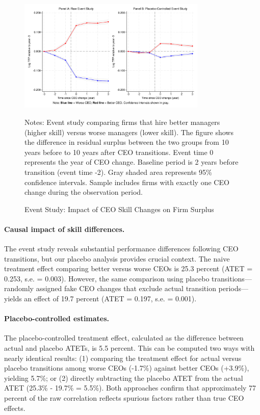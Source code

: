 \documentclass[11pt,a4paper]{article}
\begin{document}
\begin{figure}[htbp]
\centering
\includegraphics[width=0.8\textwidth]{figure/event_study.pdf}
\caption{Event Study: Impact of CEO Skill Changes on Firm Surplus}
\label{fig:event_study}
\footnotesize
Notes: Event study comparing firms that hire better managers (higher skill) versus worse managers (lower skill). The figure shows the difference in residual surplus between the two groups from 10 years before to 10 years after CEO transitions. Event time 0 represents the year of CEO change. Baseline period is 2 years before transition (event time -2). Gray shaded area represents 95\% confidence intervals. Sample includes firms with exactly one CEO change during the observation period.
\end{figure}

\paragraph{Causal impact of skill differences.} The event study reveals substantial performance differences following CEO transitions, but our placebo analysis provides crucial context. The naive treatment effect comparing better versus worse CEOs is 25.3 percent (ATET = 0.253, s.e. = 0.003). However, the same comparison using placebo transitions---randomly assigned fake CEO changes that exclude actual transition periods---yields an effect of 19.7 percent (ATET = 0.197, s.e. = 0.001).

\paragraph{Placebo-controlled estimates.} The placebo-controlled treatment effect, calculated as the difference between actual and placebo ATETs, is 5.5 percent. This can be computed two ways with nearly identical results: (1) comparing the treatment effect for actual versus placebo transitions among worse CEOs (-1.7\%) against better CEOs (+3.9\%), yielding 5.7\%; or (2) directly subtracting the placebo ATET from the actual ATET (25.3\% - 19.7\% = 5.5\%). Both approaches confirm that approximately 77 percent of the raw correlation reflects spurious factors rather than true CEO effects.
\end{document}
